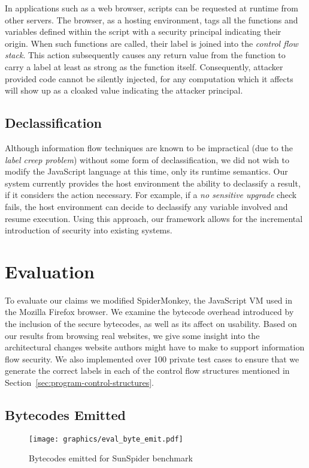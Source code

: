 \documentclass{llncs}
\begin{document}
In applications such as a web browser, scripts can be requested at runtime from other servers.
The browser, as a hosting environment, tags all the functions and variables defined within the script with a security principal indicating their origin.
When such functions are called, their label is joined into the \textit{control flow stack}.
This action subsequently causes any return value from the function to carry a label at least as strong as the function itself.
Consequently, attacker provided code cannot be silently injected, for any computation which it affects will show up as a cloaked value indicating the attacker principal.

\subsection{Declassification}

Although information flow techniques are known to be impractical (due to the \emph{label creep problem}) without some form of declassification, we did not wish to modify the JavaScript language at this time, only its runtime semantics.
Our system currently provides the host environment the ability to declassify a result, if it considers the action necessary.
For example, if a \textit{no sensitive upgrade} check fails, the host environment can decide to declassify any variable involved and resume execution.
Using this approach, our framework allows for the incremental introduction of security into existing systems.


\section{Evaluation}
\label{sec:evaluation}

To evaluate our claims we modified SpiderMonkey, the JavaScript VM used in the Mozilla Firefox browser.
We examine the bytecode overhead introduced by the inclusion of the secure bytecodes, as well as its affect on usability.
Based on our results from browsing real websites, we give some insight into the architectural changes website authors might have to make to support information flow security.
We also implemented over 100 private test cases to ensure that we generate the correct labels in each of the control flow structures mentioned in Section~\ref{sec:program-control-structures}.

\subsection{Bytecodes Emitted}
\begin{figure}[h]
   \centerline{\texttt{[image: graphics/eval\_byte\_emit.pdf]}}
  \caption{Bytecodes emitted for SunSpider benchmark}
  \label{fig:bytecodes_emitted}
\end{figure}
\end{document}
